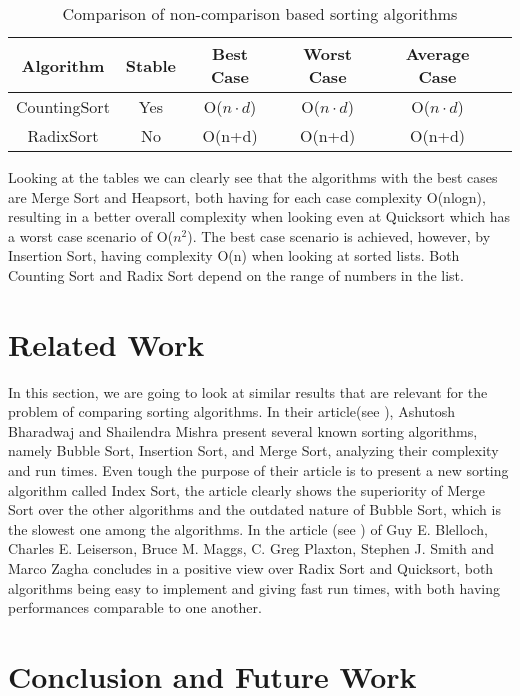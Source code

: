 \documentclass{article}
\numberwithin{figure}{section}
\begin{document}
\begin{table}[h!]
\begin{center}
\begin{tabular}{|c|c|c|c|c|c|} 
\hline
Algorithm & Stable & Best Case & Worst Case & Average Case \\
\hline
CountingSort & Yes & O($n\cdot d$) & O($n\cdot d$) & O($n\cdot d$) \\ 
RadixSort & No & O(n+d) & O(n+d) & O(n+d) \\ 
\hline
\end{tabular}
\end{center}
\caption{Comparison of non-comparison based sorting algorithms}
\end{table}

Looking at the tables we can clearly see that the algorithms with the best cases are Merge Sort and Heapsort, both having for each case complexity O(nlogn), resulting in a better overall complexity when looking even at Quicksort which has a worst case scenario of O(\(n^2\)). The best case scenario is achieved, however, by Insertion Sort, having complexity O(n) when looking at sorted lists. Both Counting Sort and Radix Sort depend on the range of numbers in the list.


\section{Related Work}

In this section, we are going to look at similar results that are relevant for the problem of comparing sorting algorithms. In their article(see \cite{Ash}), Ashutosh Bharadwaj and Shailendra Mishra present several known sorting algorithms, namely Bubble Sort, Insertion Sort, and Merge Sort, analyzing their complexity and run times. Even tough the purpose of their article is to present a new sorting algorithm called Index Sort, the article clearly shows the superiority of Merge Sort over the other algorithms and the outdated nature of Bubble Sort, which is the slowest one among the algorithms. In the article (see \cite{Guy}) of Guy E. Blelloch, Charles E. Leiserson, Bruce M. Maggs, C. Greg Plaxton, Stephen J. Smith and Marco Zagha concludes in a positive view over Radix Sort and Quicksort, both algorithms being easy to implement and giving fast run times, with both having performances comparable to one another. 

\section{Conclusion and Future Work}
\end{document}
